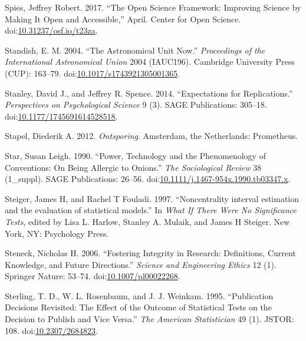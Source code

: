 \documentclass[a5paper]{book}
\begin{document}
\hypertarget{ref-doi:10.31237ux2fosf.ioux2ft23za}{}
Spies, Jeffrey Robert. 2017. ``The Open Science Framework: Improving
Science by Making It Open and Accessible,'' April. Center for Open
Science.
doi:\href{https://doi.org/10.31237/osf.io/t23za}{10.31237/osf.io/t23za}.

\hypertarget{ref-doi:10.1017ux2fs1743921305001365}{}
Standish, E. M. 2004. ``The Astronomical Unit Now.'' \emph{Proceedings
of the International Astronomical Union} 2004 (IAUC196). Cambridge
University Press (CUP): 163--79.
doi:\href{https://doi.org/10.1017/s1743921305001365}{10.1017/s1743921305001365}.

\hypertarget{ref-doi:10.1177ux2f1745691614528518}{}
Stanley, David J., and Jeffrey R. Spence. 2014. ``Expectations for
Replications.'' \emph{Perspectives on Psychological Science} 9 (3). SAGE
Publications: 305--18.
doi:\href{https://doi.org/10.1177/1745691614528518}{10.1177/1745691614528518}.

\hypertarget{ref-isbn:9789044623123}{}
Stapel, Diederik A. 2012. \emph{Ontsporing}. Amsterdam, the Netherlands:
Prometheus.

\hypertarget{ref-doi:10.1111ux2fj.1467-954x.1990.tb03347.x}{}
Star, Susan Leigh. 1990. ``Power, Technology and the Phenomenology of
Conventions: On Being Allergic to Onions.'' \emph{The Sociological
Review} 38 (1\_suppl). SAGE Publications: 26--56.
doi:\href{https://doi.org/10.1111/j.1467-954x.1990.tb03347.x}{10.1111/j.1467-954x.1990.tb03347.x}.

\hypertarget{ref-Steiger1997-qq}{}
Steiger, James H, and Rachel T Fouladi. 1997. ``Noncentrality interval
estimation and the evaluation of statistical models.'' In \emph{What If
There Were No Significance Tests}, edited by Lisa L. Harlow, Stanley A.
Mulaik, and James H Steiger. New York, NY: Psychology Press.

\hypertarget{ref-doi:10.1007ux2fpl00022268}{}
Steneck, Nicholas H. 2006. ``Fostering Integrity in Research:
Definitions, Current Knowledge, and Future Directions.'' \emph{Science
and Engineering Ethics} 12 (1). Springer Nature: 53--74.
doi:\href{https://doi.org/10.1007/pl00022268}{10.1007/pl00022268}.

\hypertarget{ref-doi:10.2307ux2f2684823}{}
Sterling, T. D., W. L. Rosenbaum, and J. J. Weinkam. 1995. ``Publication
Decisions Revisited: The Effect of the Outcome of Statistical Tests on
the Decision to Publish and Vice Versa.'' \emph{The American
Statistician} 49 (1). JSTOR: 108.
doi:\href{https://doi.org/10.2307/2684823}{10.2307/2684823}.
\end{document}
